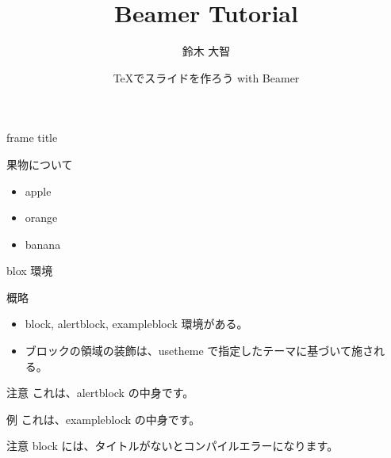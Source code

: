 \documentclass[dvipdfmx, 12pt]{beamer}  %
\title{Beamer Tutorial}
\author{鈴木 大智}
\date[2021/02/23]{\TeX でスライドを作ろう with Beamer}
\institute[日本大学大学院]{日本大学大学院 理工学研究科 数学専攻}
\begin{document}
\frame{\maketitle}

\begin{frame}{frame title}

  果物について
  
  \begin{itemize}
    \item apple
    \item orange
    \item banana
  \end{itemize}
\end{frame}

\begin{frame}{blox 環境}

  \begin{block}{概略}
    \begin{itemize}
      \item block, alertblock, exampleblock 環境がある。
      \item ブロックの領域の装飾は、usetheme で指定したテーマに基づいて施される。
    \end{itemize}
  \end{block}

  \begin{alertblock}{注意}
    これは、alertblock の中身です。
  \end{alertblock}

  \begin{exampleblock}{例}
    これは、exampleblock の中身です。
  \end{exampleblock}

  \begin{alertblock}{注意}
    block には、タイトルがないとコンパイルエラーになります。
  \end{alertblock}

\end{frame}
\end{document}
